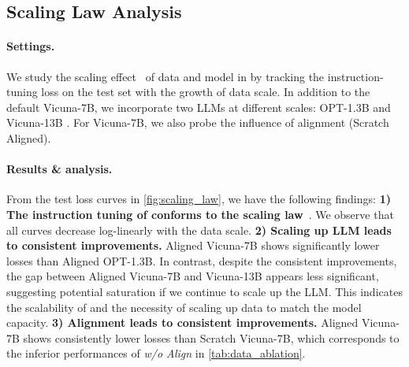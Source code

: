\documentclass{article}
\begin{document}
\subsection{Scaling Law Analysis}\label{sec:exp_scaling}

\paragraph{Settings.} 
We study the scaling effect~\citep{kaplan2020scaling,reed2022generalist} of data and model in \agent by tracking the instruction-tuning loss on the test set with the growth of data scale. In addition to the default Vicuna-7B, we incorporate two LLMs at different scales: OPT-1.3B \citep{zhang2022opt} and Vicuna-13B \citep{vicuna2023}. For Vicuna-7B, we also probe the influence of alignment (Scratch \vs Aligned).


\paragraph{Results \& analysis.} From the test loss curves in \cref{fig:scaling_law}, we have the following findings: \textbf{1) The instruction tuning of \agent conforms to the scaling law}~\citep{kaplan2020scaling,reed2022generalist}. We observe that all curves decrease log-linearly with the data scale. \textbf{2) Scaling up LLM leads to consistent improvements.} Aligned Vicuna-7B shows significantly lower losses than Aligned OPT-1.3B. In contrast, despite the consistent improvements, the gap between Aligned Vicuna-7B and Vicuna-13B appears less significant, suggesting potential saturation if we continue to scale up the LLM. This indicates the scalability of \agent and the necessity of scaling up data to match the model capacity. \textbf{3) Alignment leads to consistent improvements.} Aligned Vicuna-7B shows consistently lower losses than Scratch Vicuna-7B, which corresponds to the inferior performances of \textit{w/o Align} in \cref{tab:data_ablation}.














    
    
    
    





\end{document}

